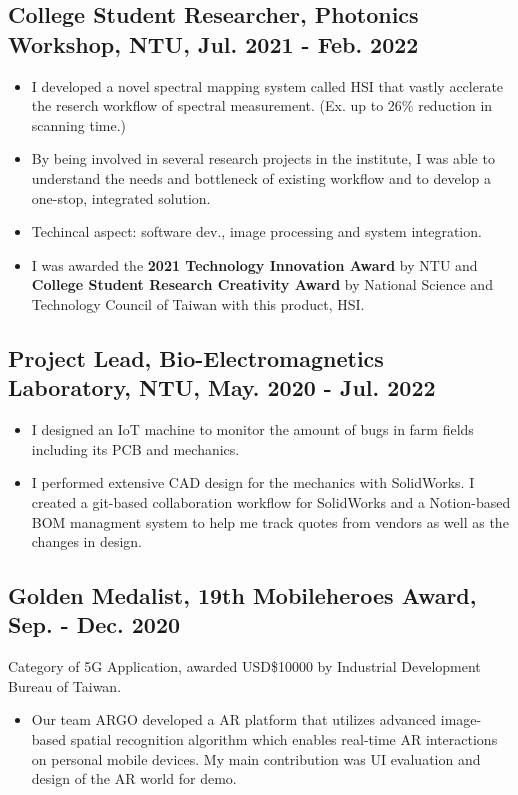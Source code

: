 \documentclass[12pt]{article}
\begin{document}
        \subsection*{College Student Researcher, Photonics Workshop, NTU, Jul. 2021 - Feb. 2022}
        {\sffamily
        \begin{itemize}
            \item I developed a novel spectral mapping system called HSI that vastly acclerate the reserch workflow of spectral measurement. (Ex. up to 26\% reduction in scanning time.)
            \item By being involved in several research projects in the institute, I was able to understand the needs and bottleneck of existing workflow and to develop a one-stop, integrated solution. 
            \item Techincal aspect: software dev., image processing and system integration. 
            \item I was awarded the \textbf{2021 Technology Innovation Award} by NTU and \textbf{College Student Research Creativity Award} by National Science and Technology Council of Taiwan with this product, HSI.
        \end{itemize}}
        \subsection*{Project Lead, Bio-Electromagnetics Laboratory, NTU, May. 2020 - Jul. 2022}
        {\sffamily
        \begin{itemize}
            \item I designed an IoT machine to monitor the amount of bugs in farm fields including its PCB and mechanics.
            \item I performed extensive CAD design for the mechanics with SolidWorks. I created a git-based collaboration workflow for SolidWorks and a Notion-based BOM managment system to help me track quotes from vendors as well as the changes in design.
        \end{itemize}
        }
        \subsection*{Golden Medalist, 19th Mobileheroes Award, Sep. - Dec. 2020}
        {\sffamily
        {\footnotesize Category of 5G Application, awarded USD\$10000 by Industrial Development Bureau of Taiwan.}
        \begin{itemize}
            \item Our team ARGO developed a AR platform that utilizes advanced image-based spatial recognition algorithm which enables real-time AR interactions on personal mobile devices. My main contribution was UI evaluation and design of the AR world for demo.   
        \end{itemize}
        }
        
\end{document}
